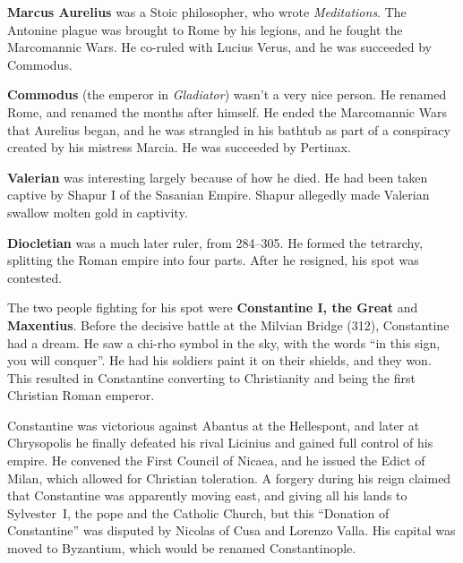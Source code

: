 \textbf{Marcus Aurelius} was a Stoic philosopher, who wrote \textit{Meditations}.
The Antonine plague was brought to Rome by his legions,
and he fought the Marcomannic Wars.
He co-ruled with Lucius Verus, and he was succeeded by Commodus.

\textbf{Commodus} (the emperor in \textit{Gladiator}) wasn't a very nice person.
He renamed Rome, and renamed the months after himself.
He ended the Marcomannic Wars that Aurelius began, and he was strangled in his bathtub
as part of a conspiracy created by his mistress Marcia.
He was succeeded by Pertinax.

\textbf{Valerian} was interesting largely because of how he died.
He had been taken captive by Shapur I of the Sasanian Empire.
Shapur allegedly made Valerian swallow molten gold in captivity.

\textbf{Diocletian} was a much later ruler, from 284--305.
He formed the tetrarchy, splitting the Roman empire into four parts.
After he resigned, his spot was contested.

The two people fighting for his spot were \textbf{Constantine I, the Great} and \textbf{Maxentius}.
Before the decisive battle at the Milvian Bridge (312), Constantine had a dream.
He saw a chi-rho symbol in the sky, with the words ``in this sign, you will conquer''.
He had his soldiers paint it on their shields, and they won.
This resulted in Constantine converting to Christianity and being the first Christian Roman emperor.

Constantine was victorious against Abantus at the Hellespont,
and later at Chrysopolis he finally defeated his rival Licinius and gained full control of his empire.
He convened the First Council of Nicaea, and he issued the Edict of Milan,
which allowed for Christian toleration.
A forgery during his reign claimed that Constantine was apparently moving east,
and giving all his lands to Sylvester~I, the pope and the Catholic Church,
but this ``Donation of Constantine'' was disputed by Nicolas of Cusa and Lorenzo Valla.
His capital was moved to Byzantium, which would be renamed Constantinople.


